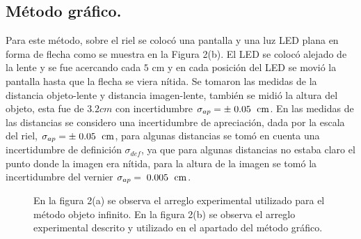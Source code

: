 \documentclass[DIV=calc, paper=a4, fontsize=10pt]{scrartcl}
\begin{document}
\subsection*{\textcolor{carmine}{Método gráfico.}}
Para este método, sobre el riel se colocó una pantalla y una luz LED plana en forma de flecha como se muestra en la Figura 2(b). El LED se colocó alejado de la lente y se fue acercando cada $5\text{ cm}$ y en cada posición del LED se movió la pantalla hasta que la flecha se viera nítida. Se tomaron las medidas de la distancia objeto-lente y distancia imagen-lente, también se midió la altura del objeto, esta fue de $3.2 cm$ con incertidumbre $\sigma_{ap}=\pm\hspace{0.1cm}0.05\hspace{0.1cm}\text{ cm}$. En las medidas de las distancias se considero una incertidumbre de apreciación, dada por la escala del riel, $\sigma_{ap}=\pm\hspace{0.1cm}0.05\hspace{0.1cm}\text{ cm}$, para algunas distancias se tomó en cuenta una incertidumbre de definición $\sigma_{def}$, ya que para algunas distancias no estaba claro el punto donde la imagen era nítida, para la altura de la imagen se tomó la incertidumbre del vernier $\sigma_{ap}=\hspace{0.1cm}0.005\hspace{0.1cm}\text{ cm}$.
\begin{figure}[H]
    \centering
 \caption{En la figura 2(a) se observa el arreglo experimental utilizado para el método objeto infinito. En la figura 2(b) se observa el arreglo experimental descrito y utilizado en el apartado del método gráfico.}
 \label{f:Desarrollo experimental}
\end{figure}
\end{document}
